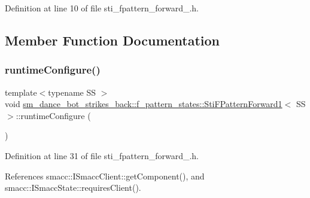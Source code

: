 Definition at line 10 of file sti\+\_\+fpattern\+\_\+forward\+\_.\+h.



\subsection{Member Function Documentation}
\mbox{\label{structsm__dance__bot__strikes__back_1_1f__pattern__states_1_1StiFPatternForward1_ae0e8a1296eb9d7be70833fa4a7783042}} 
\subsubsection{\texorpdfstring{runtime\+Configure()}{runtimeConfigure()}}
{\footnotesize\ttfamily template$<$typename SS $>$ \\
void \hyperlink{structsm__dance__bot__strikes__back_1_1f__pattern__states_1_1StiFPatternForward1}{sm\+\_\+dance\+\_\+bot\+\_\+strikes\+\_\+back\+::f\+\_\+pattern\+\_\+states\+::\+Sti\+F\+Pattern\+Forward1}$<$ SS $>$\+::runtime\+Configure (\begin{DoxyParamCaption}{ }\end{DoxyParamCaption})\hspace{0.3cm}{\ttfamily [inline]}}



Definition at line 31 of file sti\+\_\+fpattern\+\_\+forward\+\_.\+h.



References smacc\+::\+I\+Smacc\+Client\+::get\+Component(), and smacc\+::\+I\+Smacc\+State\+::requires\+Client().


